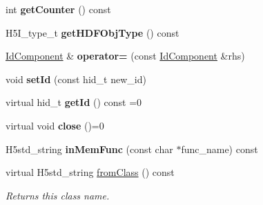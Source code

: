 \begin{DoxyCompactItemize}
int {\bfseries get\+Counter} () const
\item 
\mbox{\label{class_h5_1_1_id_component_ab1f88ad0583b9e53001505f7dbdecc82}} 
H5\+I\+\_\+type\+\_\+t {\bfseries get\+H\+D\+F\+Obj\+Type} () const
\item 
\mbox{\label{class_h5_1_1_id_component_afc33cc8a88117526bf1a344a8a16f6b5}} 
\hyperlink{class_h5_1_1_id_component}{Id\+Component} \& {\bfseries operator=} (const \hyperlink{class_h5_1_1_id_component}{Id\+Component} \&rhs)
\item 
\mbox{\label{class_h5_1_1_id_component_a1e46d85ec29cd77bb1767cd01b8f0c8d}} 
void {\bfseries set\+Id} (const hid\+\_\+t new\+\_\+id)
\item 
\mbox{\label{class_h5_1_1_id_component_a4b5dc282b178ac71704772ae575351cc}} 
virtual hid\+\_\+t {\bfseries get\+Id} () const =0
\item 
\mbox{\label{class_h5_1_1_id_component_a222cd35221706639d021975b3cb3ad00}} 
virtual void {\bfseries close} ()=0
\item 
\mbox{\label{class_h5_1_1_id_component_ad249952e5720fd4c97d6bb4b630753f9}} 
H5std\+\_\+string {\bfseries in\+Mem\+Func} (const char $\ast$func\+\_\+name) const
\item 
\mbox{\label{class_h5_1_1_id_component_a5b2f8dc9fbc2890d10c5db9ae80ddb74}} 
virtual H5std\+\_\+string \hyperlink{class_h5_1_1_id_component_a5b2f8dc9fbc2890d10c5db9ae80ddb74}{from\+Class} () const
\begin{DoxyCompactList}\small\item\em Returns this class name. \end{DoxyCompactList}\end{DoxyCompactItemize}
